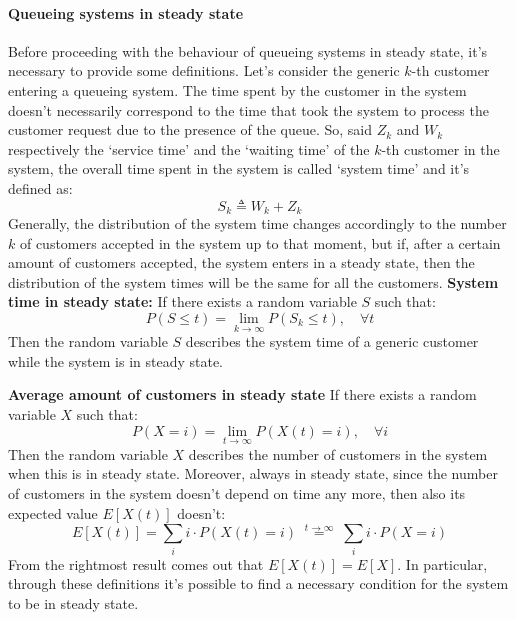 \documentclass[12pt,a4paper]{article}
\begin{document}
\paragraph{Queueing systems in steady state}
Before proceeding with the behaviour of queueing systems in steady state, it's necessary to provide some definitions. Let's consider the generic $k$-th customer entering a queueing system. The time spent by the customer in the system doesn't necessarily correspond to the time that took the system to process the customer request due to the presence of the queue. So, said $Z_k$ and $W_k$ respectively the `service time' and the `waiting time' of the $k$-th customer in the system, the overall time spent in the system is called `system time' and it's defined as:
$$
S_k \triangleq W_k+Z_k
$$ 
Generally, the distribution of the system time changes accordingly to the number $k$ of customers accepted in the system up to that moment, but if, after a certain amount of customers accepted, the system enters in a steady state, then the distribution of the system times will be the same for all the customers.
\newpage
\noindent
\textbf{System time in steady state: }
If there exists a random variable $S$ such that:
\begin{equation*}
P(S \leq t) = \lim_{k \rightarrow \infty}P(S_k \leq t), \quad \forall t 
\end{equation*}
Then the random variable $S$ describes the system time of a generic customer while the system is in steady state.

\bigskip
\noindent
\textbf{Average amount of customers in steady state } If there exists a random variable $X$ such that:
\begin{equation*}
P(X = i) = \lim_{t\rightarrow \infty} P(X(t) = i), \quad \forall i
\end{equation*}
Then the random variable $X$ describes the number of customers in the system when this is in steady state. Moreover, always in steady state, since the number of customers in the system doesn't depend on time any more, then also its expected value $E[X(t)]$ doesn't:
\begin{equation*}
E[X(t)] = \sum_{i} i \cdot P(X(t) = i) \; \overset{t\rightarrow \infty}{=} \; \sum_{i} i \cdot P(X = i)
\end{equation*}
From the rightmost result comes out that $E\left[X(t)\right]=E\left[X\right]$.
In particular, through these definitions it's possible to find a necessary condition for the system to be in steady state.
\end{document}
